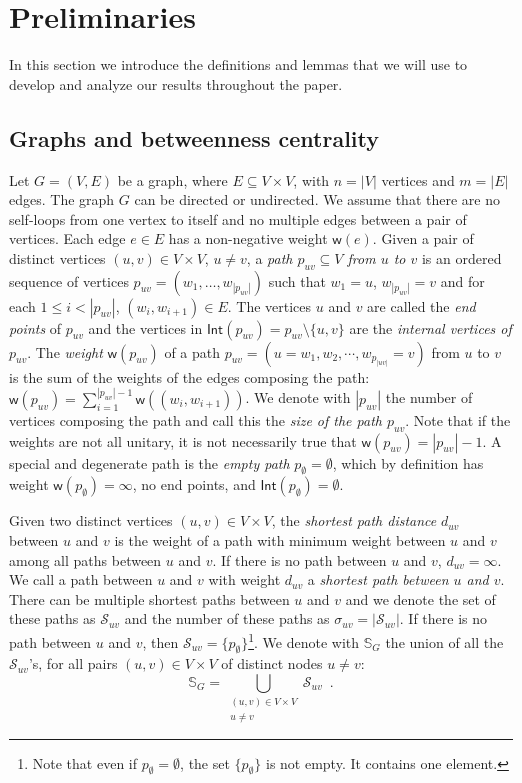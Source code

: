 \section{Preliminaries}\label{sec:centrsamplprelims}
In this section we introduce the definitions and lemmas that we will use to
develop and analyze our results throughout the paper.

\subsection{Graphs and betweenness centrality}\label{sec:centrsamplgraphprelims}
Let $G=(V,E)$ be a graph, where $E\subseteq V\times V$, with $n=|V|$ vertices
and $m=|E|$ edges. The graph $G$ can be directed or undirected. We assume that
there are no self-loops from one vertex to itself and no multiple edges between
a pair of vertices. Each edge $e\in E$ has a non-negative weight
$\mathsf{w}(e)$. Given a pair of distinct vertices $(u,v)\in V\times V$,
$u\neq v$, a \emph{path $p_{uv}\subseteq V$ from $u$ to $v$} is an ordered sequence of
vertices $p_{uv}=(w_1,\dotsc,w_{|p_{uv}|})$ such that $w_1=u$, $w_{|p_{uv}|}=v$ and
for each $1\le i < |p_{uv}|$, $(w_i,w_{i+1})\in E$. The vertices $u$ and $v$ are
called the \emph{end points} of $p_{uv}$ and the vertices in
$\mathsf{Int}(p_{uv})=p_{uv}\setminus\{u,v\}$ are the \emph{internal vertices of
$p_{uv}$}. The \emph{weight}
$\mathsf{w}(p_{uv})$ of a path $p_{uv}=(u=w_1,w_2,\cdots,w_{p_{|uv|}}=v)$ from
$u$ to $v$ is the sum of the weights of the edges composing the path:
$\mathsf{w}(p_{uv})=\sum_{i=1}^{|p_{uv}|-1}\mathsf{w}((w_i,w_{i+1}))$. We denote with
$|p_{uv}|$ the number of vertices composing the path and call this the
\emph{size of the path $p_{uv}$}. Note that if the weights are not all unitary,
it is not necessarily true that $\mathsf{w}(p_{uv})=|p_{uv}|-1$. A special and
degenerate path is the \emph{empty path} $p_{\emptyset}=\emptyset$, which by
definition has weight $\mathsf{w}(p_\emptyset)=\infty$, no end points, and
$\mathsf{Int}(p_\emptyset)=\emptyset$.

Given two distinct vertices $(u,v)\in V\times V$, the \emph{shortest path distance}
$d_{uv}$ between $u$ and $v$ is the weight of a path with minimum weight 
between $u$ and $v$ among all paths between $u$ and $v$. If there is no path
between $u$ and $v$, $d_{uv}=\infty$. We call a path between $u$ and $v$ with
weight $d_{uv}$ a \emph{shortest path between $u$ and $v$}. There can be
multiple shortest paths between $u$ and $v$ and we denote the set of these paths
as $\mathcal{S}_{uv}$ and the number of these paths as
$\sigma_{uv}=|\mathcal{S}_{uv}|$. If there is no path between $u$ and $v$, then
$\mathcal{S}_{uv}=\{p_\emptyset\}$\footnote{Note that even if
$p_\emptyset=\emptyset$, the set $\{p_\emptyset\}$ is not empty. It contains
one element.}.
We denote with $\mathbb{S}_G$ the union of all the $\mathcal{S}_{uv}$'s, for all
pairs $(u,v)\in V\times V$ of distinct nodes $u\neq v$: 
\[ \mathbb{S}_G=\bigcup_{\substack{(u,v)\in V\times V \\ u\neq v}}\mathcal{S}_{uv}\enspace.\]

